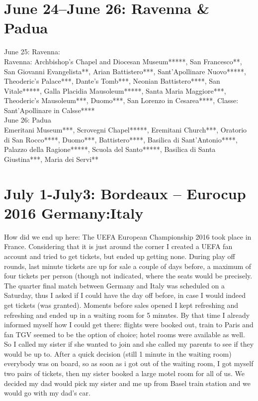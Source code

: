 \section{June 24--June 26: Ravenna \& Padua}
\label{RavennaPadua}

June 25: Ravenna:\\
Ravenna: Archbishop's Chapel and Diocesan Museum*****, San Francesco**, San Giovanni Evangelista**, Arian Battistero***, Sant'Apollinare Nuovo*****, Theoderic's Palace***, Dante's Tomb***, Neonian Battistero****, San Vitale*****, Galla Placidia Mausoleum*****, Santa Maria Maggiore***, Theoderic's Mausoleum***, Duomo***, San Lorenzo in Cesarea****, Classe: Sant'Apollinare in Calsse****\\

June 26: Padua\\
Emeritani Museum***, Scrovegni Chapel*****, Eremitani Church***, Oratorio di San Rocco****, Duomo***, Battistero****, Basilica di Sant'Antonio****, Palazzo della Ragione*****, Scuola del Santo*****, Basilica di Santa Giustina***, Maria dei Servi**

\section{July 1-July3: Bordeaux -- Eurocup 2016 Germany:Italy}
\label{2016:Bordeaux}

How did we end up here: The UEFA European Championship 2016 took place in France. Considering that it is just around the corner I created a UEFA fan account and tried to get tickets, but ended up getting none. During play off rounds, last minute tickets are up for sale a couple of days before, a maximum of four tickets per person (though not indicated, where the seats would be precisely. The quarter final match between Germany and Italy was scheduled on a Saturday, thus I asked if I could have the day off before, in case I would indeed get tickets (was granted). Moments before sales opened I kept refreshing and refreshing and ended up in a waiting room for 5 minutes. By that time I already informed myself how I could get there: flights were booked out, train to Paris and fan TGV seemed to be the option of choice; hotel rooms were available as well. So I called my sister if she wanted to join and she called my parents to see if they would be up to. After a quick decision (still 1 minute in the waiting room) everybody was on board, so as soon as i got out of the waiting room, I got myself two pairs of tickets, then my sister booked a large motel room for all of us. We decided my dad would pick my sister and me up from Basel train station and we would go with my dad's car.\\

